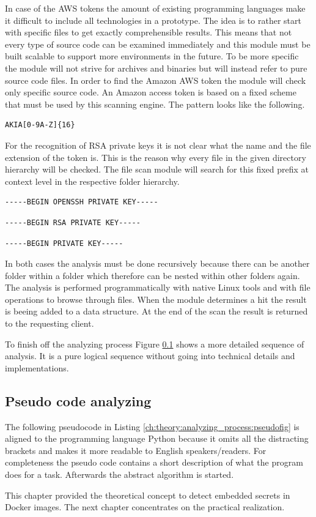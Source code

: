 In case of the AWS tokens the amount of existing programming languages make it difficult to include all technologies in a prototype. 
The idea is to rather start with specific files to get exactly comprehensible results. 
This means that not every type of source code can be examined immediately and this module must be built scalable to support more environments in the future.
To be more specific the module will not strive for archives and binaries but will instead refer to pure source code files.
In order to find the Amazon AWS token the module will check only specific source code.
An Amazon access token is based on a fixed scheme that must be used by this scanning engine.
The pattern looks like the following.
\begin{lstlisting}
AKIA[0-9A-Z]{16}
\end{lstlisting}

For the recognition of RSA private keys it is not clear what the name and the file extension of the token is.
This is the reason why every file in the given directory hierarchy will be checked.
The file scan module will search for this fixed prefix at context level in the respective folder hierarchy.
\begin{lstlisting}
-----BEGIN OPENSSH PRIVATE KEY-----
\end{lstlisting}
\begin{lstlisting}
-----BEGIN RSA PRIVATE KEY-----
\end{lstlisting}
\begin{lstlisting}
-----BEGIN PRIVATE KEY-----
\end{lstlisting}

In both cases the analysis must be done recursively because there can be another folder within a folder which therefore can be nested within other folders again.
The analysis is performed programmatically with native Linux tools and with file operations to browse through files.
When the module determines a hit the result is beeing added to a data structure.
At the end of the scan the result is returned to the requesting client.

To finish off the analyzing process Figure \ref{ch:theory:analyzing_pseudocode} shows a more detailed sequence of analysis.
It is a pure logical sequence without going into technical details and implementations. 

\subsection{Pseudo code analyzing}
\label{ch:theory:analyzing_pseudocode}
The following pseudocode in Listing \ref{ch:theory:analyzing_process:pseudofig} is aligned to the programming language Python because it omits all the distracting brackets and makes it more readable to English speakers/readers.
For completeness the pseudo code contains a short description of what the program does for a task. 
Afterwards the abstract algorithm is started.

This chapter provided the theoretical concept to detect embedded secrets in Docker images. The next chapter concentrates on the practical realization.
